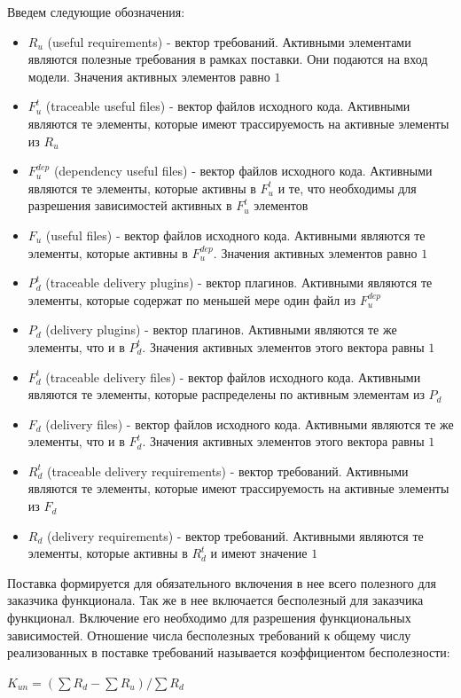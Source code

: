 \documentclass{article}
\begin{document}
  Введем следующие обозначения:
  \begin{itemize}
    \item $R_{u}$ (useful requirements) - вектор требований. Активными элементами являются полезные требования в рамках поставки. Они подаются на вход модели. Значения активных элементов равно $1$
    \item $F^{t}_{u}$ (traceable useful files) - вектор файлов исходного кода. Активными являются те элементы, которые имеют трассируемость на активные элементы из $R_{u}$
    \item $F^{dep}_{u}$ (dependency useful files) - вектор файлов исходного кода. Активными являются те элементы, которые активны в $F^{t}_{u}$ и те, что необходимы для разрешения зависимостей активных в $F^{t}_{u}$ элементов
    \item $F_{u}$ (useful files) - вектор файлов исходного кода. Активными являются те элементы, которые активны в $F^{dep}_{u}$. Значения активных элементов равно $1$
    \item $P^{t}_{d}$ (traceable delivery plugins) - вектор плагинов. Активными являются те элементы, которые содержат по меньшей мере один файл из $F^{dep}_{u}$
    \item $P_{d}$ (delivery plugins) - вектор плагинов. Активными являются те же элементы, что и в $P^{t}_{d}$. Значения активных элементов этого вектора равны $1$
    \item $F^{t}_{d}$ (traceable delivery files) - вектор файлов исходного кода. Активными являются те элементы, которые распределены по активным элементам из $P_{d}$
    \item $F_{d}$ (delivery files) - вектор файлов исходного кода. Активными являются те же элементы, что и в $F^{t}_{d}$. Значения активных элементов этого вектора равны $1$
    \item $R^{t}_{d}$ (traceable delivery requirements) - вектор требований. Активными являются те элементы, которые имеют трассируемость на активные элементы из $F_{d}$
    \item $R_{d}$ (delivery requirements) - вектор требований. Активными являются те элементы, которые активны в $R^{t}_{d}$ и имеют значение $1$
  \end{itemize}

  Поставка формируется для обязательного включения в нее всего полезного для заказчика функционала. Так же в нее включается бесполезный для заказчика функционал. Включение его необходимо для разрешения функциональных зависимостей. Отношение числа бесполезных требований к общему числу реализованных в поставке требований называется коэффициентом бесполезности: 
  \begin{center}
    $K_{un} = (\sum R_{d} - \sum R_{u}) / \sum R_{d}$ 
  \end{center}
  
\end{document}
